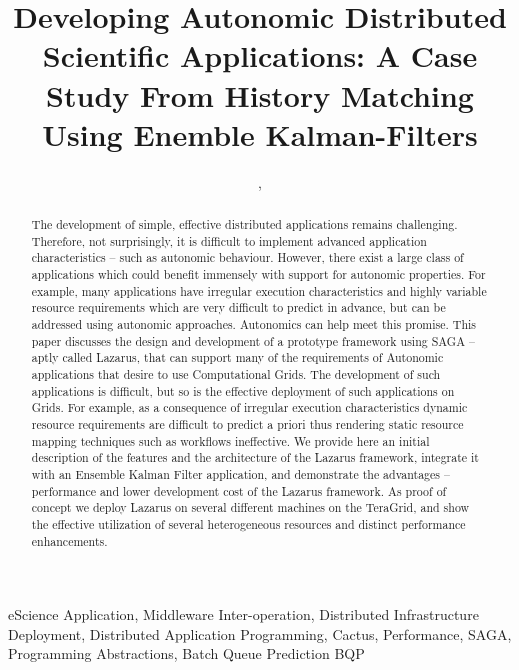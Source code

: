 \documentclass[conference,final]{IEEEtran}
\begin{document}
\title{\large Developing Autonomic Distributed Scientific
  Applications: A Case Study From History Matching Using Enemble
  Kalman-Filters}
  
\author{,
    
}
\maketitle
 \begin{abstract}
   The development of simple, effective distributed applications
   remains challenging.  Therefore, not surprisingly, it is difficult
   to implement advanced application characteristics -- such as
   autonomic behaviour. However, there exist a large class of
   applications which could benefit immensely with support for
   autonomic properties.  For example, many applications have
   irregular execution characteristics and highly variable resource
   requirements which are very difficult to predict in advance, but
   can be addressed using autonomic approaches.  Autonomics can help
   meet this promise. This paper discusses the design and development
   of a prototype framework using SAGA -- aptly called Lazarus, that
   can support many of the requirements of Autonomic applications that
   desire to use Computational Grids.  The development of such
   applications is difficult, but so is the effective deployment of
   such applications on Grids.  For example, as a consequence of
   irregular execution characteristics dynamic resource requirements
   are difficult to predict a priori thus rendering static resource
   mapping techniques such as workflows ineffective.  We provide here
   an initial description of the features and the architecture of the
   Lazarus framework, integrate it with an Ensemble Kalman Filter
   application, and demonstrate the advantages -- performance and
   lower development cost of the Lazarus framework.  As proof of
   concept we deploy Lazarus on several different machines on the
   TeraGrid, and show the effective utilization of several
   heterogeneous resources and distinct performance enhancements.
 \end{abstract}
 \begin{keywords}
   eScience Application, Middleware Inter-operation, Distributed
   Infrastructure Deployment, Distributed Application Programming,
   Cactus, Performance, SAGA, Programming Abstractions, Batch Queue
   Prediction BQP
 \end{keywords}
\end{document}
